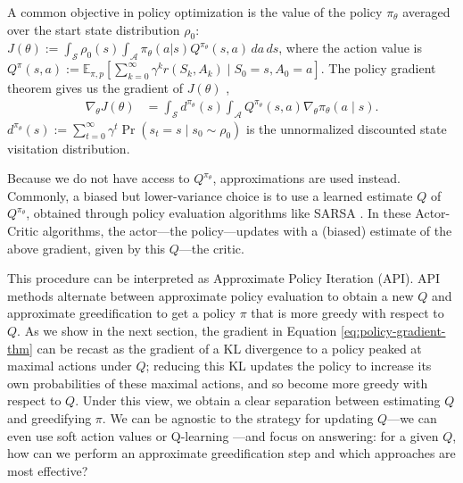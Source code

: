 \documentclass{article}
\newcommand{\Ex}{\mathbb{E}}
\newcommand{\statespace}{\mathcal{S}}
\newcommand{\actionspace}{\mathcal{A}}
\newcommand{\Qhat}{{Q}}
\newcommand{\policyparams}{\theta}
\newcommand{\defeq}{:=}
\begin{document}
A common objective in policy optimization is the value of
the policy $\pi_\policyparams$ averaged over the start state distribution $\rho_0$: $J(\policyparams) \defeq \int_{\statespace} \rho_0(s) \int_{\actionspace} \pi_\policyparams(a | s) Q^{\pi_\policyparams}(s, a) \, da \, ds$,
where the action value is $Q^{\pi}(s,a) \defeq \Ex_{\pi, p}\left[ \sum_{k = 0}^\infty \gamma^k r(S_k, A_k) \mid S_0 = s, A_0 = a \right]$.
The {policy gradient theorem} gives us the gradient of $J(\policyparams)$ \citep{sutton2000policy},
\begin{align}\label{eq:policy-gradient-thm}
    \nabla_\policyparams J(\policyparams) &= \int_{\statespace} d^{\pi_\policyparams}(s) \int_{\actionspace} Q^{\pi_\policyparams}(s, a) \nabla_\policyparams \pi_\policyparams(a \mid s)
    .
\end{align}
%
$d^{\pi_\policyparams}(s) \defeq \!\sum_{t = 0}^\infty \!\gamma^t \Pr(s_t = s \!\mid\! s_0\! \sim \rho_0\!)$ is the {unnormalized discounted state visitation distribution}. 

Because we do not have access to $Q^{\pi_\policyparams}$, approximations are used instead. %
Commonly, a biased but lower-variance choice is to use a learned estimate $\Qhat$ of $Q^{\pi_\policyparams}$, obtained through policy evaluation algorithms like SARSA \citep{sutton2018reinforcement}. In these Actor-Critic algorithms, the actor---the policy---updates with a (biased) estimate of the above gradient, given by this $\Qhat$---the critic. 

This procedure can be interpreted as Approximate Policy Iteration (API). API methods alternate between approximate policy evaluation to obtain a new $\Qhat$ and approximate greedification to get a policy $\pi$ that is more greedy with respect to $\Qhat$. As we show in the next section, the gradient in Equation \eqref{eq:policy-gradient-thm} can be recast as the gradient of a KL divergence to a policy peaked at maximal actions under $\Qhat$; reducing this KL updates the policy to increase its own probabilities of these maximal actions, and so become more greedy with respect to $\Qhat$. Under this view, we obtain a clear separation between estimating $\Qhat$ and greedifying $\pi$. We can be agnostic to the strategy for updating $\Qhat$---we can even use soft action values \citep{ziebart2010modeling} or Q-learning \citep{watkins1992q}---and focus on answering: for a given $\Qhat$, how can we perform an approximate greedification step and which approaches are most effective? 
   
\end{document}
